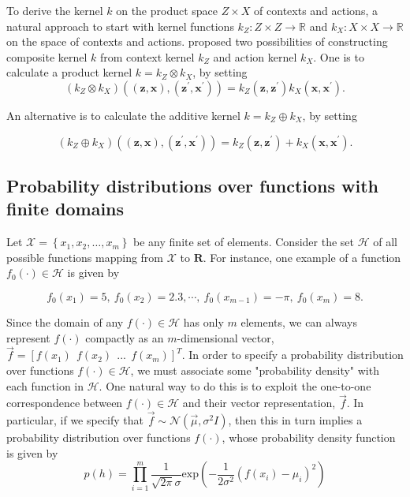 \documentclass{article}
\begin{document}
To derive the kernel $k$ on the product space $Z\times X$ of contexts and
actions, a natural approach to start with kernel functions $k_Z:
Z\times Z \rightarrow \mathbb{R}$ and $k_X:X \times X \rightarrow
\mathbb{R}$ on the space of contexts and actions. \cite{Krause2011-sb}
proposed two possibilities of constructing composite kernel $k$ from
context kernel $k_Z$ and action kernel $k_X$. One is to calculate a
product kernel $k=k_Z\otimes k_X$, by setting
\begin{equation}
  (k_Z\otimes k_X)((\mathbf{z}, \mathbf{x}),(\mathbf{z}^{\prime},
  \mathbf{x}^{\prime})) = k_Z(\mathbf{z}, \mathbf{z}^{\prime})k_X(\mathbf{x}, \mathbf{x}^{\prime}).
\end{equation}

An alternative is to calculate the additive kernel $k=k_Z\oplus k_X$,
by setting

\begin{equation}
  (k_Z\oplus k_X)((\mathbf{z}, \mathbf{x}),(\mathbf{z}^{\prime},
  \mathbf{x}^{\prime})) = k_Z(\mathbf{z}, \mathbf{z}^{\prime})+k_X(\mathbf{x}, \mathbf{x}^{\prime}).
\end{equation}
\subsection{Probability distributions over functions with finite domains}
Let $\mathcal{X} = \left \{ x_1, x_2, …, x_m \right \}$ be any finite set of elements. Consider the set $\mathcal{H}$ of all possible functions mapping from $\mathcal{X}$ to $\mathbf{R}$. For instance, one example of a function $f_0(\cdot) \in \mathcal{H}$ is given by

$$f_0(x_1)=5,~f_0(x_2)=2.3, \dotsb ,~f_0(x_{m-1})=-\pi,~f_0(x_m)=8.$$

Since the domain of any $f(\cdot) \in \mathcal{H}$ has only $m$ elements, we can always represent $f(\cdot)$ compactly as an $m$-dimensional vector, $\vec{f}=[f(x_1)~~f(x_2)~~...~~f(x_m) ]^T$. In order to specify a probability distribution over functions $f(\cdot) \in \mathcal{H}$, we must associate some "probability density" with each function in $\mathcal{H}$. One natural way to do this is to exploit the one-to-one correspondence between $f(\cdot) \in \mathcal{H}$ and their vector representation, $\vec{f}$. In particular, if we specify that $\vec{f}\sim \mathcal{N}(\vec{\mu},\sigma ^2I)$, then this in turn implies a probability distribution over functions $f(\cdot)$, whose probability density function is given by
$$p(h) = \prod_{i=1}^{m} \frac{1}{\sqrt{2\pi}\sigma}\mathrm{exp}(-\frac{1}{2\sigma ^2} (f(x_i)-\mu _i)^2)
$$
\end{document}
